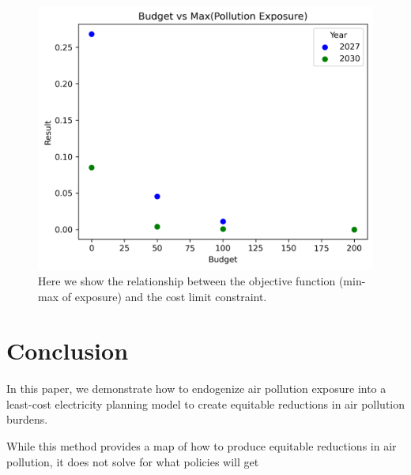 \documentclass[a4paper]{article}
\theoremstyle{definition}
\theoremstyle{plain}
\begin{document}
\begin{figure}
    \centering
    \includegraphics[width=0.7\linewidth]{Figures/EndogenousResults/base_short/exposure_cost_PPF.png}
    \caption{Here we show the relationship between the objective function (min-max of exposure) and the cost limit constraint.}
    \label{PPF}
\end{figure}

\section{Conclusion}
In this paper, we demonstrate how to endogenize air pollution exposure into a least-cost electricity planning model to create equitable reductions in air pollution burdens.    

While this method provides a map of how to produce equitable reductions in air pollution, it does not solve for what policies will get


\begin{singlespace}
\newpage

%

\end{singlespace}
\end{document}
